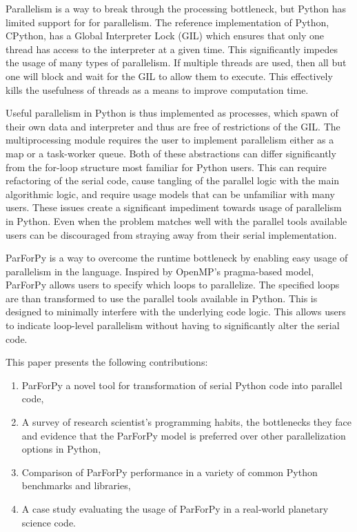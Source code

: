 \documentclass[conference]{IEEEtran}
\begin{document}
Parallelism is a way to break through the processing bottleneck,
but Python has limited support for for parallelism.
The reference implementation of Python, CPython, has a 
Global Interpreter Lock (GIL) which ensures that only one thread 
has access to the interpreter at a given
time.\cite{beazley2010understanding}
This significantly impedes the usage of many types of parallelism.
If multiple threads are used, then all but one will block and wait for the
GIL to allow them to execute. 
This effectively kills the usefulness of threads as a means to improve
computation time.


Useful parallelism in Python is thus implemented as processes, which spawn
of their own data and interpreter and thus are free of restrictions of the GIL.
The multiprocessing module requires the user to implement parallelism 
either as a map or a task-worker queue. 
Both of these abstractions can differ significantly from the for-loop 
structure most familiar for Python users. 
This can require refactoring of the serial code, cause 
tangling of the parallel logic with the main algorithmic 
logic, and require usage models that can be unfamiliar with many users.
These issues create a significant impediment towards usage of parallelism in Python. 
Even when the problem matches well with the parallel tools available 
users can be discouraged from straying away from their serial 
implementation.

ParForPy is a way to overcome the runtime bottleneck by enabling
easy usage of parallelism in the language. 
Inspired by OpenMP's pragma-based model\cite{dagum1998openmp}, 
ParForPy allows users to specify which loops to parallelize. 
The specified loops are than
transformed to use the parallel tools available in Python. 
This is designed to minimally interfere with the underlying code logic.
This allows users to indicate loop-level parallelism without having to
significantly alter the serial code.


This paper presents the following contributions: 
\begin{enumerate}
    \item ParForPy a novel tool for transformation of serial Python code
    into parallel code,
    \item A survey of research scientist's programming habits, the
    bottlenecks they face and evidence that the ParForPy model is 
    preferred over other parallelization options in Python,
    \item Comparison of ParForPy performance in a variety of 
    common Python benchmarks and libraries,
    \item A case study evaluating the usage of ParForPy in
    a real-world planetary science code. 
\end{enumerate}
\end{document}

